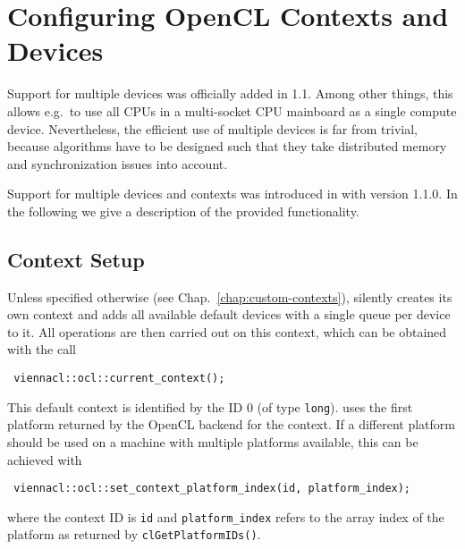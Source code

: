 
\chapter{Configuring OpenCL Contexts and Devices} \label{chap:multi-devices}
Support for multiple devices was officially added in {\OpenCL} 1.1.
Among other things, this allows e.g.~to use all CPUs in a multi-socket CPU mainboard as a single {\OpenCL} compute device.
Nevertheless, the efficient use of multiple {\OpenCL} devices is far from trivial, because algorithms have to be designed such that 
they take distributed memory and synchronization issues into account.

Support for multiple {\OpenCL} devices and contexts was introduced in {\ViennaCL} with version 1.1.0. In the following we give a description of the 
provided functionality.


\section{Context Setup}
Unless specified otherwise (see Chap.~\ref{chap:custom-contexts}), {\ViennaCL} silently creates its own context and adds all available default devices with a single queue per device to it.
All operations are then carried out on this context, which can be obtained with the call
\begin{lstlisting}
 viennacl::ocl::current_context();
\end{lstlisting}
This default context is identified by the ID $0$ (of type \lstinline|long|).
{\ViennaCL} uses the first platform returned by the OpenCL backend for the context.
If a different platform should be used on a machine with multiple platforms available,
this can be achieved with
\begin{lstlisting}
 viennacl::ocl::set_context_platform_index(id, platform_index);
\end{lstlisting}
where the context ID is \lstinline|id| and \lstinline|platform_index| refers to the array index of the platform as returned by \lstinline|clGetPlatformIDs()|.

